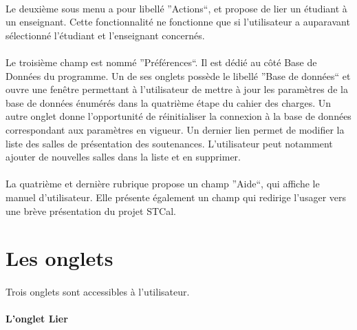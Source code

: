 \documentclass[a4paper,10pt]{report}
\begin{document}
	  \paragraph{}
	    Le deuxième sous menu a pour libellé ''Actions``, et propose de lier un étudiant à un enseignant. 
	    Cette fonctionnalité ne fonctionne que si l'utilisateur a auparavant sélectionné l'étudiant et l'enseignant concernés.
	  \paragraph{}
	    Le troisième champ est nommé ''Préférences``.
	    Il est dédié au côté Base de Données du programme.
	    Un de ses onglets possède le libellé ''Base de données`` et ouvre une fenêtre permettant à l'utilisateur de mettre à jour les paramètres de la base de données énumérés dans la quatrième étape du cahier des charges. 
	    Un autre onglet donne l'opportunité de réinitialiser la connexion à la base de données correspondant aux paramètres en vigueur.
	    Un dernier lien permet de modifier la liste des salles de présentation des soutenances. 
	    L'utilisateur peut notamment ajouter de nouvelles salles dans la liste et en supprimer.
	  \paragraph{}
	    La quatrième et dernière rubrique propose un champ ''Aide``, qui affiche le manuel d'utilisateur.
	    Elle présente également un champ qui redirige l'usager vers une brève présentation du projet STCal. 

	    
        \section{Les onglets}
	  
	  \paragraph{}
	    Trois onglets sont accessibles à l'utilisateur.
	  
	  \paragraph{L'onglet Lier}
	  ~\\~\\
	  
\end{document}

